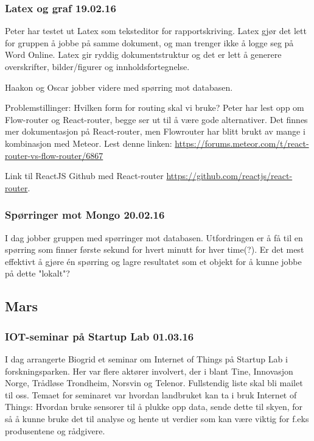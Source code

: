 \documentclass[12pt, oneside]{article}
\begin{document}
\subsubsection{Latex og graf 19.02.16}
Peter har testet ut Latex som teksteditor for rapportskriving. Latex gjør det lett for gruppen å jobbe på samme dokument, og man trenger ikke å logge seg på Word Online. Latex gir ryddig dokumentstruktur og det er lett å generere overskrifter, bilder/figurer og innholdsfortegnelse. 

Haakon og Oscar jobber videre med spørring mot databasen. 

Problemstillinger: Hvilken form for routing skal vi bruke? Peter har lest opp om Flow-router og React-router, begge ser ut til å være gode alternativer. Det finnes mer dokumentasjon på React-router, men Flowrouter har blitt brukt av mange i kombinasjon med Meteor. Lest denne linken: \url{https://forums.meteor.com/t/react-router-vs-flow-router/6867}

Link til ReactJS Github med React-router \url{https://github.com/reactjs/react-router}.



\subsubsection{Spørringer mot Mongo 20.02.16}
I dag jobber gruppen med spørringer mot databasen. Utfordringen er å få til en spørring som finner første sekund for hvert minutt for hver time(?).
Er det mest effektivt å gjøre én spørring og lagre resultatet som et objekt for å kunne jobbe på dette "lokalt"?



\subsection{Mars}


\subsubsection{IOT-seminar på Startup Lab 01.03.16}
I dag arrangerte Biogrid et seminar om Internet of Things på Startup Lab i forskningsparken. Her var flere aktører involvert, der i blant Tine, Innovasjon Norge, Trådløse Trondheim, Norsvin og Telenor. Fullstendig liste skal bli mailet til oss. Temaet for seminaret var hvordan landbruket kan ta i bruk Internet of Things: Hvordan bruke sensorer til å plukke opp data, sende dette til skyen, for så å kunne bruke det til analyse og hente ut verdier som kan være viktig for f.eks produsentene og rådgivere. 
\end{document}
